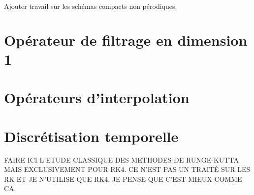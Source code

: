 Ajouter travail sur les schémas compacts non pérodiques. 























\section{Opérateur de filtrage en dimension 1}



\section{Opérateurs d'interpolation}


\section{Discrétisation temporelle}


FAIRE ICI L'ETUDE CLASSIQUE DES METHODES DE RUNGE-KUTTA MAIS EXCLUSIVEMENT POUR RK4.
CE N'EST PAS UN TRAITÉ SUR LES RK ET JE N'UTILISE QUE RK4.
JE PENSE QUE C'EST MIEUX COMME CA.
